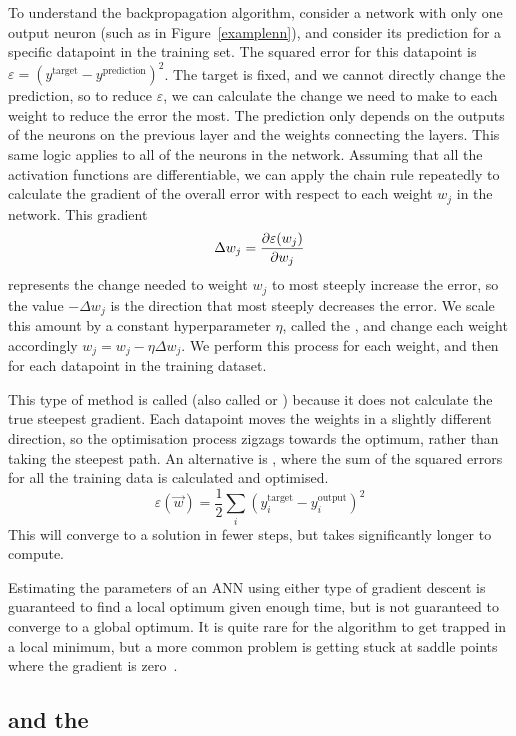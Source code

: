 To understand the backpropagation algorithm, consider a network with only one output neuron (such as in Figure~\ref{examplenn}), and consider its prediction for a specific datapoint in the training set.
The squared error for this datapoint is \(\varepsilon = \left(y^\text{target} - y^\text{prediction}\right)^2\).
The target is fixed, and we cannot directly change the prediction, so to reduce \(\varepsilon\), we can calculate the change we need to make to each weight to reduce the error the most.
The prediction only depends on the outputs of the neurons on the previous layer and the weights connecting the layers.
This same logic applies to all of the neurons in the network.
Assuming that all the activation functions are differentiable, we can apply the chain rule repeatedly to calculate the gradient of the overall error with respect to each weight \(w_j\) in the network.
This gradient
\[ \Delta w_j = \pdv{\varepsilon(w_j)}{w_j} \]
represents the change needed to weight \(w_j\) to most steeply increase the error, so the value \(-\Delta w_j\) is the direction that most steeply decreases the error.
We scale this amount by a constant hyperparameter \(\eta\), called the , and change each weight accordingly \(w_j = w_j - \eta \Delta w_j\).
We perform this process for each weight, and then for each datapoint in the training dataset.

This type of method is called  (also called  or ) because it does not calculate the true steepest gradient.
Each datapoint moves the weights in a slightly different direction, so the optimisation process zigzags towards the optimum, rather than taking the steepest path.
An alternative is , where the sum of the squared errors for all the training data is calculated and optimised.
\[ \varepsilon(\vec{w}) = \frac{1}{2} \sum_{i}\left(y_i^\text{target} - y_i^\text{output}\right)^2 \]
This will converge to a solution in fewer steps, but takes significantly longer to compute.

Estimating the parameters of an \ac{ANN} using either type of gradient descent is guaranteed to find a local optimum given enough time, but is not guaranteed to converge to a global optimum.
It is quite rare for the algorithm to get trapped in a local minimum, but a more common problem is getting stuck at saddle points where the gradient is zero~\autocite[438]{lecun2015}.

\subsection{\citeauthor{minsky1987} and the }


